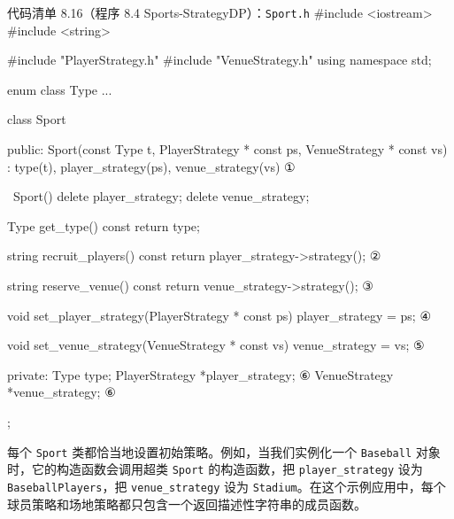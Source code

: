 \begin{codeboxt}{代码清单 8.16（程序 8.4 Sports-StrategyDP）：\texttt{Sport.h}}
#include <iostream>
#include <string>

#include "PlayerStrategy.h"
#include "VenueStrategy.h"
using namespace std;

enum class Type ...

class Sport
{
public:
    Sport(const Type t,
          PlayerStrategy * const ps, VenueStrategy * const vs)
        : type(t), player_strategy(ps), venue_strategy(vs) {} ①

    ~Sport()
    {
        delete player_strategy;
        delete venue_strategy;
    }

    Type get_type() const { return type; }

    string recruit_players() const
    {
        return player_strategy->strategy();                   ②
    }

    string reserve_venue() const
    {
        return venue_strategy->strategy();                    ③
    }

    void set_player_strategy(PlayerStrategy * const ps)
    {
        player_strategy = ps;                                 ④
    }

    void set_venue_strategy(VenueStrategy * const vs)
    {
        venue_strategy = vs;                                  ⑤
    }

private:
    Type type;
    PlayerStrategy *player_strategy;                          ⑥
    VenueStrategy  *venue_strategy;                           ⑥
};
\end{codeboxt}
\par
{}\par
{}\par
{}\par
{}\par
{}\par

每个 \texttt{Sport} 类都恰当地设置初始策略。例如，当我们实例化一个 \texttt{Baseball} 对象时，它的构造函数会调用超类 \texttt{Sport} 的构造函数，把 \texttt{player\_\allowbreak{}strategy} 设为 \texttt{Baseball\allowbreak{}Players}，把 \texttt{venue\_\allowbreak{}strategy} 设为 \texttt{Stadium}。在这个示例应用中，每个球员策略和场地策略都只包含一个返回描述性字符串的成员函数。

